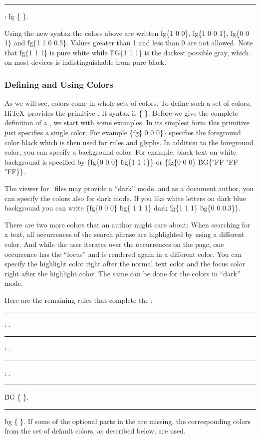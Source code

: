 \medskip
\rule{}:
\.{fg} \.{\{}     \.{\}}.
\medskip

Using the new syntax the colors above are written
\.{fg\{1 0 0\}}, \.{fg\{1 0 0 1\}},
\.{fg\{0 0 1\}} and \.{fg\{1 1 0 0.5\}}.
Values greater than 1 and less than 0 are not allowed.
Note that \.{fg\{1 1 1\}} is pure white while  \.{FG\{1 1 1\}} is
the darkest possible gray, which on most devices is indistinguishable
from pure black. 

\subsubsection{Defining and Using Colors}
As we will see, colors come in whole sets of colors.
To define such a set of colors, Hi\TeX\ provides
the primitive . It syntax is
\medskip
\prim{} \.{\{}  \.{\}}.
\medskip
Before we give the complete definition of a  ,
we start with some examples.
In its simplest form this primitive just specifies a single color.
For example \.{\{fg\{ 0 0 0\}\}} specifies
the foreground color black which is then used for rules and glyphs.
In addition to the foreground color, you can specify a background color.
For example, black text on white background is specified by
\.{\{fg\{0 0 0\}} \.{bg\{1 1 1\}\}} or
\.{\{fg\{0 0 0\}} \.{BG\{"FF "FF "FF\}\}}.

The viewer for \HINT\ files may provide a ``dark'' mode, and as a document
author, you can specify the colors also for dark mode.
If you like white letters on dark blue background you can write
\.{\{fg\{0 0 0\}} \.{bg\{ 1 1 1\}}
\.{dark} \.{fg\{1 1 1\}} \.{bg\{0 0 0.3\}\}}.

There are two more colors that an author might care about: When searching
for a text, all occurrences of the search phrase are highlighted by
using a different color. And while the user iterates over the occurrences
on the page, one occurrence has the ``focus'' and is rendered again in a
different color. You can specify the highlight color right after
the normal text color and the focus color right after the highlight color.
The same can be done for the colors in ``dark'' mode.

Here are the remaining rules that complete the :

\medskip
\rule{}:  .
\rule{}:
     .
\rule{}:
     .
\rule{}:
\.{BG} \.{\{}     \.{\}}.
\rule{}:
\.{bg} \.{\{}     \.{\}}.
\medskip
If some of the optional parts in the  are missing,
the corresponding colors from the set of default colors, as described below,
are used.

